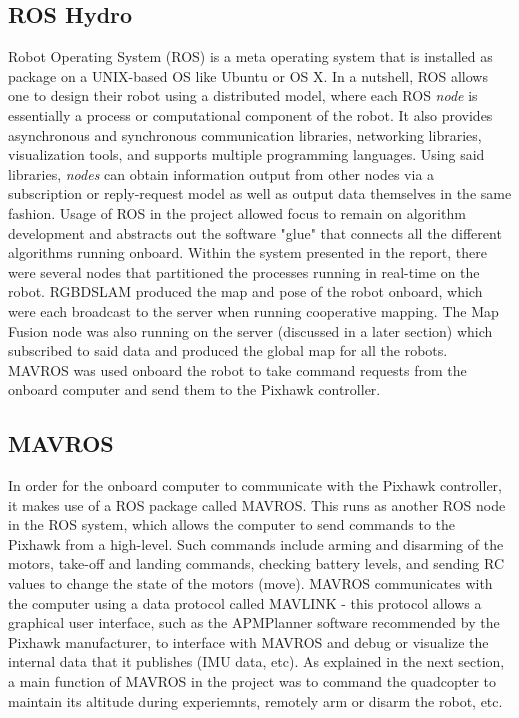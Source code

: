 \documentclass[letterpaper, oneside, 10pt]{report}
\begin{document}
\subsection{ROS Hydro}
Robot Operating System (ROS) is a meta operating system that is installed as package on a UNIX-based OS like Ubuntu or OS X. In a nutshell, ROS allows one to design their robot using a distributed model, where each ROS \textsl{node} is essentially a process or computational component of the robot. It also provides asynchronous and synchronous communication libraries, networking libraries, visualization tools, and supports multiple programming languages. Using said libraries, \textsl{nodes} can obtain information output from other nodes via a subscription or reply-request model as well as output data themselves in the same fashion. Usage of ROS in the project allowed focus to remain on algorithm development and abstracts out the software "glue" that connects all the different algorithms running onboard. Within the system presented in the report, there were several nodes that partitioned the processes running in real-time on the robot. RGBDSLAM produced the map and pose of the robot onboard, which were each broadcast to the server when running cooperative mapping. The Map Fusion node was also running on the server (discussed in a later section) which subscribed to said data and produced the global map for all the robots. MAVROS was used onboard the robot to take command requests from the onboard computer and send them to the Pixhawk controller.

\subsection{MAVROS}

In order for the onboard computer to communicate with the Pixhawk controller, it makes use of a ROS package called MAVROS. This runs as another ROS node in the ROS system, which allows the computer to send commands to the Pixhawk from a high-level. Such commands include arming and disarming of the motors, take-off and landing commands, checking battery levels, and sending RC values to change the state of the motors (move). MAVROS communicates with the computer using a data protocol called MAVLINK - this protocol allows a graphical user interface, such as the APMPlanner software recommended by the Pixhawk manufacturer, to interface with MAVROS and debug or visualize the internal data that it publishes (IMU data, etc). As explained in the next section, a main function of MAVROS in the project was to command the quadcopter to maintain its altitude during experiemnts, remotely arm or disarm the robot, etc.
\end{document}
